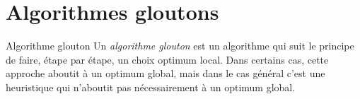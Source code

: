 \documentclass[11pt]{article}
\begin{document}









    \section{Algorithmes gloutons}

  \begin{definition}{Algorithme glouton}
    Un \emph{algorithme glouton} est un algorithme qui suit le principe de faire, étape par étape, un choix optimum local.
    Dans certains cas, cette approche aboutit à un optimum global, mais dans le cas général c'est une heuristique qui n'aboutit pas nécessairement à un optimum global.
  \end{definition}
\end{document}
